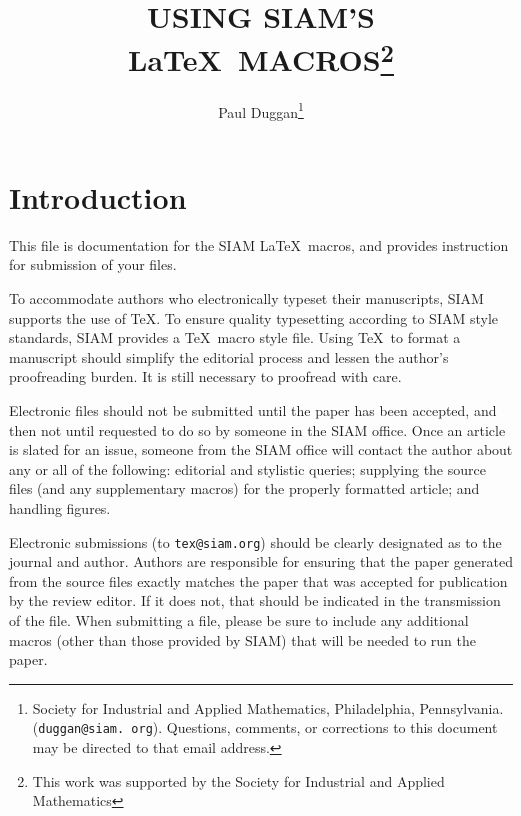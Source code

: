 %


\title{USING SIAM'S \LaTeX\ MACROS\thanks{This work was
supported by the Society for Industrial and Applied
Mathematics}} 

\author{Paul Duggan\thanks{Society for Industrial and
Applied Mathematics, Philadelphia, Pennsylvania. 
({\tt duggan@siam. org}). Questions, comments, or corrections
to this document may be directed to that email address.}}



\maketitle

\section{Introduction}

This file is documentation for the SIAM \LaTeX\ macros, and
provides instruction for submission of your files.

To accommodate authors who electronically typeset their manuscripts,
SIAM supports the use of \TeX. To ensure quality typesetting according
to SIAM style standards, SIAM provides a \TeX\ macro style file.
Using \TeX\ to format a manuscript should simplify the editorial process
and lessen the author's proofreading burden. It is still necessary to 
proofread with care.

Electronic files should not be submitted until the paper has been
accepted, and then not until requested to do so by someone in the SIAM
office. Once an article is slated for an issue,
someone from the SIAM office will contact the author about any or all
of the following: editorial and stylistic queries; 
supplying the source files (and any supplementary macros)
for the properly formatted article; and handling figures.

Electronic submissions (to {\tt tex@siam.org}) should be clearly
designated as to the journal and author. Authors are responsible for ensuring 
that the paper generated from the source files exactly matches the paper that
was accepted for publication by the review editor. If it does not,
that should be indicated in the transmission of the file.
When submitting a file, please be sure to include any additional
macros (other than those provided by SIAM) that will be needed to run
the paper.

